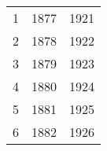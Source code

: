 % 
\begin{tabular}{ccc}
  \hline
  \hline
1 & 1877 & 1921 \\ 
  2 & 1878 & 1922 \\ 
  3 & 1879 & 1923 \\ 
  4 & 1880 & 1924 \\ 
  5 & 1881 & 1925 \\ 
  6 & 1882 & 1926 \\ 
   \hline
\end{tabular}
